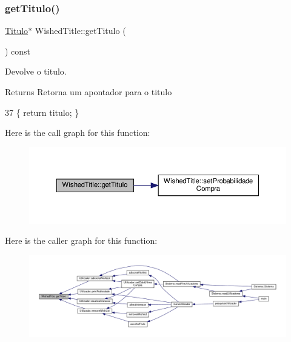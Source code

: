\subsubsection{\texorpdfstring{get\+Titulo()}{getTitulo()}}
{\footnotesize\ttfamily \hyperlink{classTitulo}{Titulo}$\ast$ Wished\+Title\+::get\+Titulo (\begin{DoxyParamCaption}{ }\end{DoxyParamCaption}) const\hspace{0.3cm}{\ttfamily [inline]}}



Devolve o titulo. 

\begin{DoxyReturn}{Returns}
Retorna um apontador para o titulo 
\end{DoxyReturn}

\begin{DoxyCode}
37 \{ \textcolor{keywordflow}{return} titulo;  \}
\end{DoxyCode}
Here is the call graph for this function\+:
\nopagebreak
\begin{figure}[H]
\begin{center}
\leavevmode
\includegraphics[width=350pt]{classWishedTitle_a9ca6e92a26bb2f319a39d5a03b0c42bd_cgraph}
\end{center}
\end{figure}
Here is the caller graph for this function\+:
\nopagebreak
\begin{figure}[H]
\begin{center}
\leavevmode
\includegraphics[width=350pt]{classWishedTitle_a9ca6e92a26bb2f319a39d5a03b0c42bd_icgraph}
\end{center}
\end{figure}
\mbox{\label{classWishedTitle_a3acf82b03096f649740573441e1cb343}} 

